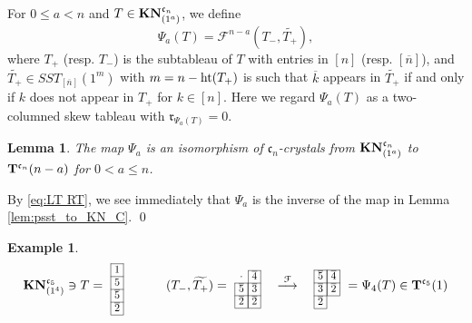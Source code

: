 \documentclass[leqno,11pt]{amsart}
\newtheorem{lem}[thm]{\bf Lemma}
\newtheorem{ex}[thm]{\bf Example}
\numberwithin{equation}{section}
\newcommand{\pf}{\noindent{\bfseries Proof. }}
\newcommand{\ov}{\overline}
\newcommand{\td}{\widetilde}
\newcommand{\mc}{\mathcal}
\newcommand{\mf}{\mathfrak}
\begin{document}
For $0\leq a<n$ and $T\in {\bf KN}^{\mf c_n}_{(1^a)}$, we define
\begin{equation}\label{eq:KN_C_to_psst}
\Psi_a(T)={\mc F}^{n-a}(T_-,\td{T_+}),
\end{equation}
where $T_+$ (resp. $T_-$) is the subtableau of $T$ with entries in $[n]$ (resp. $[\ov{n}]$), and $\td{T_+}\in SST_{[\ov{n}]}(1^m)$ with $m=n-{\rm ht}(T_+)$ is such that $\ov k$ appears in $\td{T_+}$ if and only if $k$ does not appear in $T_+$ for $k\in [n]$. Here we regard $\Psi_a(T)$ as a two-columned skew tableau with $\mf r_{\Psi_a(T)}=0$.

\begin{lem}\label{lem:KN_C_to_psst}
The map $\Psi_a$ is an isomorphism of ${\mf c}_n$-crystals from ${\bf KN}^{\mf c_n}_{(1^a)}$ to ${\bf T}^{\mf c_n}(n-a)$ for $0< a \leq n$.
\end{lem}
\pf By \eqref{eq:LT RT}, we see immediately that $\Psi_a$ is the inverse of the map in Lemma \ref{lem:psst_to_KN_C}.
\qed
  
\begin{ex}{\rm  
$$
{\bf KN}_{(1^4)}^{\mf c_5}\ni {T} = \
\resizebox{.03\hsize}{!}{$
{\def\lr#1{\multicolumn{1}{|@{\hspace{.75ex}}c@{\hspace{.75ex}}|}{\raisebox{-.04ex}{$#1$}}}\raisebox{-.6ex}
{$\begin{array}{c}
\cline{1-1} 
\lr{1} \\ 
\cline{1-1} 
\lr{5} \\ 
\cline{1-1}   
\lr{\overline{5}}\\ 
\cline{1-1}
\lr{\overline{2}}\\ 
\cline{1-1}  
\end{array}$}}$}\ \ \ \ \ \ \ \ \ \ 
(T_-, \td{T_+}) =\
\resizebox{.06\hsize}{!}{$  
{\def\lr#1{\multicolumn{1}{|@{\hspace{.75ex}}c@{\hspace{.75ex}}|}{\raisebox{-.04ex}{$#1$}}}\raisebox{-.6ex}
{$\begin{array}{cc}
\cline{2-2}
\cdot &\lr{\overline{4}}\\ 
\cline{1-1}\cline{2-2}
\lr{\overline{5}}&\lr{\overline{3}}\\ 
\cline{1-1}\cline{2-2}
\lr{\overline{2}}&\lr{\overline{2}}\\ 
\cline{1-2}  
\end{array}$}}$}
\ \ \  \stackrel{{\mc F}}{\longrightarrow } \ \ \
\resizebox{.06\hsize}{!}{$
{\def\lr#1{\multicolumn{1}{|@{\hspace{.75ex}}c@{\hspace{.75ex}}|}{\raisebox{-.04ex}{$#1$}}}\raisebox{-.6ex}
{$\begin{array}{cc}
\cline{1-1}\cline{2-2}
\lr{\overline{5}}&\lr{\overline{4}}\\ 
\cline{1-1}\cline{2-2}
\lr{\overline{3}}&\lr{\overline{2}}\\ 
\cline{1-1}\cline{2-2}
\lr{\overline{2}}\\ 
\cline{1-1}  
\end{array}$}}
$}
\ = \Psi_4(T)  \in {\bf T}^{\mf c_5}(1)$$
}
\end{ex}
\end{document}
